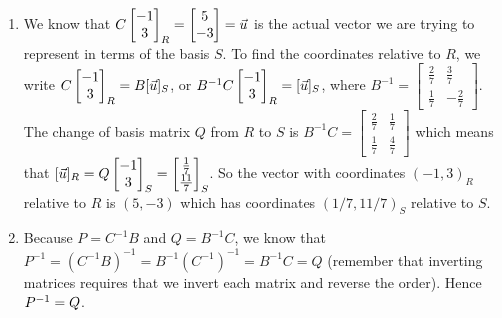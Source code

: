 \begin{example}
\begin{enumerate}
\item
We know that $C \begin{bmatrix} -1\\3 \end{bmatrix}_{R} = \begin{bmatrix} 5\\-3 \end{bmatrix} =\vec u$ is the actual vector we are trying to represent in terms of the basis $S$. To find the coordinates relative to $R$, we write $C \begin{bmatrix} -1\\3 \end{bmatrix}_{R} = B[\vec u]_{S}$, or $B^{-1}C  \begin{bmatrix} -1\\3 \end{bmatrix}_{R}= [\vec u]_{S}$, where 
$B^{-1} = 
\begin{bmatrix}
 \frac{2}{7} & \frac{3}{7} \\
 \frac{1}{7} & -\frac{2}{7}
\end{bmatrix}
$. 
The change of basis matrix $Q$ from $R$ to $S$  is 
$B^{-1}C =  
\begin{bmatrix}
 \frac{2}{7} & \frac{1}{7} \\
 \frac{1}{7} & \frac{4}{7}
\end{bmatrix}
$ which means that $[\vec u]_{R}= Q\begin{bmatrix} -1\\3 \end{bmatrix}_S = \begin{bmatrix} \frac{1}{7}\\\frac{11}{7} \end{bmatrix}_{S}$.
So the vector with coordinates $(-1,3)_{R}$ relative to $R$ is $(5,-3)$ which has coordinates $(1/7,11/7)_{S}$ relative to $S$. 
\item Because $P=C^{-1}B$ and $Q=B^{-1}C$, we know that $P^{-1} = (C^{-1}B)^{-1} = B^{-1}(C^{-1})^{-1} = B^{-1}C=Q$ (remember that inverting matrices requires that we invert each matrix and reverse the order). Hence $P^{-1} = Q$.

\end{enumerate}
\end{example}


